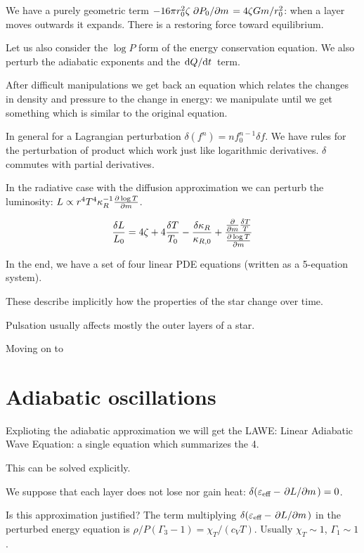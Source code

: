 \documentclass[main.tex]{subfiles}
\begin{document}
We have a purely geometric term \(-16 \pi r_0^2 \zeta \pdv*{P_0}{m} = 4 \zeta Gm /r_0^2\): when a layer moves outwards it expands.
There is a restoring force toward equilibrium.

Let us also consider the \(\log P\) form of the energy conservation equation.
We also perturb the adiabatic exponents and the \(\dv*{Q}{t} \) term.

After difficult manipulations we get back an equation which relates the changes in density and pressure to the change in energy: we manipulate until we get something which is similar to the original equation.

In general for a Lagrangian perturbation \(\delta (f^n) = n f_0^{n-1} \delta f\).
We have rules for the perturbation of product which work just like logarithmic derivatives. \(\delta\) commutes with partial derivatives.

In the radiative case with the diffusion approximation we can perturb the luminosity: \(L  \propto r^4 T^4 \kappa_R^{-1} \pdv{\log T}{m}\).

\begin{equation}
  \frac{\delta L}{L_0} = 4 \zeta + 4 \frac{\delta T}{T_0} - \frac{\delta \kappa_R}{\kappa_{R,0}} + \frac{\pdv{}{m}  \frac{\delta T}{T}}{\pdv{\log T}{m}}
\end{equation}

In the end, we have a set of four linear PDE equations (written as a 5-equation system).

These describe implicitly how the properties of the star change over time.

Pulsation usually affects mostly the outer layers of a star.

Moving on to

\section{Adiabatic oscillations}

Explioting the adiabatic approximation we will get the LAWE: Linear Adiabatic Wave Equation: a single equation which summarizes the 4.

This can be solved explicitly.

We suppose that each layer does not lose nor gain heat: \(\delta (\varepsilon_{\text{eff}} - \pdv*{L}{m} )=0\).

Is this approximation justified? The term multiplying \(\delta (\varepsilon_{\text{eff}} - \pdv*{L}{m} )\) in the perturbed energy equation is \(\rho/P (\Gamma_3-1) = \chi_T / (c_V T)\).
Usually \(\chi_T \sim 1\), \(\Gamma_1 \sim 1\).
\end{document}
